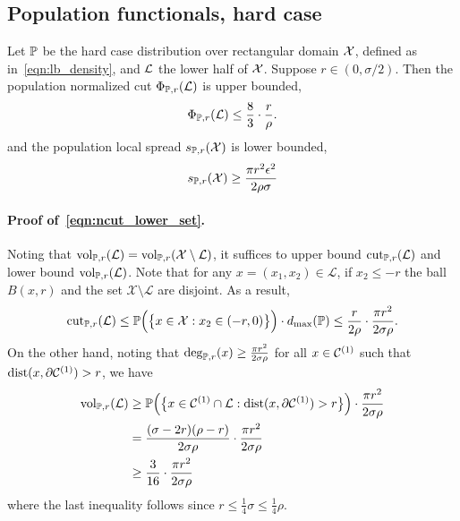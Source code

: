 \subsection{Population functionals, hard case}
\label{subsec:density_cluster_hard_case}
Let $\mathbb{P}$ be the hard case distribution over rectangular domain $\mathcal{X}$, defined as in~\eqref{eqn:lb_density}, and $\mathcal{L}$ the lower half of $\mathcal{X}$. Suppose $r \in (0,\sigma/2)$. Then the population normalized cut $\Phi_{\mathbb{P},r}(\mathcal{L})$ is upper bounded,
\begin{equation}
\label{eqn:ncut_lower_set}
\Phi_{\mathbb{P},r}(\mathcal{L}) \leq \frac{8}{3} \cdot \frac{r}{\rho}.
\end{equation}
and the population local spread $s_{\mathbb{P},r}(\mathcal{X})$ is lower bounded,
\begin{equation}
\label{eqn:local_spread_ub}
s_{\mathbb{P},r}(\mathcal{X}) \geq \frac{\pi r^2 \epsilon^2}{2 \rho\sigma}
\end{equation}

\paragraph{Proof of~\eqref{eqn:ncut_lower_set}.}
	Noting that $\mathrm{vol}_{\mathbb{P},r}(\mathcal{L}) = \mathrm{vol}_{\mathbb{P},r}(\mathcal{X} \setminus \mathcal{L})$, it suffices to upper bound $\mathrm{cut}_{\mathbb{P},r}(\mathcal{L})$ and lower bound $\mathrm{vol}_{\mathbb{P},r}(\mathcal{L})$. Note that for any $x = (x_1,x_2) \in \mathcal{L}$, if $x_2 \leq -r$ the ball $B(x,r)$ and the set $\mathcal{X}\setminus\mathcal{L}$ are disjoint. As a result,
	\begin{equation*}
	\mathrm{cut}_{\mathbb{P},r}(\mathcal{L}) \leq \mathbb{P}\Bigl(\bigl\{x \in \mathcal{X}: x_2 \in (-r,0)\bigr\}\Bigr) \cdot d_{\max}(\mathbb{P}) \leq \frac{r}{2 \rho} \cdot \frac{\pi r^2}{2 \sigma \rho}.
	\end{equation*}
	On the other hand, noting that $\deg_{\mathbb{P},r}(x) \geq \frac{\pi r^2}{2 \sigma \rho}$ for all $x \in \mathcal{C}^{(1)}$ such that $\mathrm{dist}(x, \partial \mathcal{C}^{(1)}) > r$, we have
	\begin{align*}
	\mathrm{vol}_{\mathbb{P},r}(\mathcal{L}) & \geq \mathbb{P}\Bigl(\bigl\{x \in \mathcal{C}^{(1)} \cap \mathcal{L}: \mathrm{dist}(x, \partial \mathcal{C}^{(1)}) > r\bigr\}\Bigr) \cdot \frac{\pi r^2}{2 \sigma \rho} \\
	& = \frac{(\sigma - 2r)(\rho - r)}{2 \sigma \rho} \cdot \frac{\pi r^2}{2 \sigma \rho}  \\
	& \geq \frac{3}{16} \cdot \frac{\pi r^2}{2 \sigma \rho}
	\end{align*}
	where the last inequality follows since $r \leq \frac{1}{4}\sigma \leq \frac{1}{4}\rho$. 

